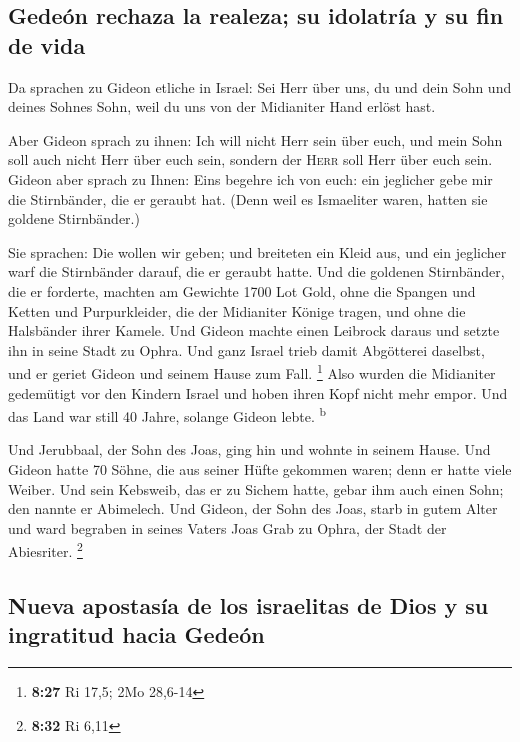 \hypertarget{gedeuxf3n-rechaza-la-realeza-su-idolatruxeda-y-su-fin-de-vida}{%
\subsection{Gedeón rechaza la realeza; su idolatría y su fin de
vida}\label{gedeuxf3n-rechaza-la-realeza-su-idolatruxeda-y-su-fin-de-vida}}

 Da sprachen zu Gideon etliche in Israel: Sei Herr über
uns, du und dein Sohn und deines Sohnes Sohn, weil du uns von der
Midianiter Hand erlöst hast.

 Aber Gideon sprach zu ihnen: Ich will nicht Herr sein
über euch, und mein Sohn soll auch nicht Herr über euch sein, sondern
der \textsc{Herr} soll Herr über euch sein.  Gideon aber
sprach zu Ihnen: Eins begehre ich von euch: ein jeglicher gebe mir die
Stirnbänder, die er geraubt hat. (Denn weil es Ismaeliter waren, hatten
sie goldene Stirnbänder.)

 Sie sprachen: Die wollen wir geben; und breiteten ein
Kleid aus, und ein jeglicher warf die Stirnbänder darauf, die er geraubt
hatte.  Und die goldenen Stirnbänder, die er forderte,
machten am Gewichte 1700 Lot Gold, ohne die Spangen und Ketten und
Purpurkleider, die der Midianiter Könige tragen, und ohne die Halsbänder
ihrer Kamele.  Und Gideon machte einen Leibrock daraus
und setzte ihn in seine Stadt zu Ophra. Und ganz Israel trieb damit
Abgötterei daselbst, und er geriet Gideon und seinem Hause zum Fall.
\footnote{\textbf{8:27} Ri 17,5; 2Mo 28,6-14}  Also
wurden die Midianiter gedemütigt vor den Kindern Israel und hoben ihren
Kopf nicht mehr empor. Und das Land war still 40 Jahre, solange Gideon
lebte. \textsuperscript{b}

 Und Jerubbaal, der Sohn des Joas, ging hin und wohnte in
seinem Hause.  Und Gideon hatte 70 Söhne, die aus seiner
Hüfte gekommen waren; denn er hatte viele Weiber.  Und
sein Kebsweib, das er zu Sichem hatte, gebar ihm auch einen Sohn; den
nannte er Abimelech.  Und Gideon, der Sohn des Joas,
starb in gutem Alter und ward begraben in seines Vaters Joas Grab zu
Ophra, der Stadt der Abiesriter. \footnote{\textbf{8:32} Ri 6,11}

\hypertarget{nueva-apostasuxeda-de-los-israelitas-de-dios-y-su-ingratitud-hacia-gedeuxf3n}{%
\subsection{Nueva apostasía de los israelitas de Dios y su ingratitud
hacia
Gedeón}\label{nueva-apostasuxeda-de-los-israelitas-de-dios-y-su-ingratitud-hacia-gedeuxf3n}}

